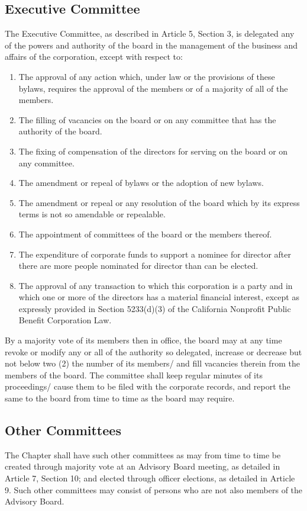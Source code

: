 \documentclass{article}
\begin{document}
	\subsection{Executive Committee}
	The Executive Committee, as described in Article 5, Section 3, is delegated any of the powers and authority of the board in the management of the business and affairs of the corporation, except with respect to:
	\begin{enumerate}[\indent (a)]
		\item The approval of any action which, under law or the provisions of these bylaws, requires the approval of the members or of a majority of all of the members.
		\item The filling of vacancies on the board or on any committee that has the authority of the board. 
		\item The fixing of compensation of the directors for serving on the board or on any committee.
		\item The amendment or repeal of bylaws or the adoption of new bylaws.
		\item The amendment or repeal or any resolution of the board which by its express terms is not so amendable or repealable.
		\item The appointment of committees of the board or the members thereof.
		\item The expenditure of corporate funds to support a nominee for director after there are more people nominated for director than can be elected.
		\item The approval of any transaction to which this corporation is a party and in which one or more of the directors has a material financial interest, except as expressly provided in Section 5233(d)(3) of the California Nonprofit Public Benefit Corporation Law.
	\end{enumerate}
	By a majority vote of its members then in office, the board may at any time revoke or modify any or all of the authority so delegated, increase or decrease but not below two (2) the number of its members/ and fill vacancies therein from the members of the board.
	The committee shall keep regular minutes of its proceedings/ cause them to be filed with the corporate records, and report the same to the board from time to time as the board may require.
	
	\subsection{Other Committees}
	The Chapter shall have such other committees as may from time to time be created through majority vote at an Advisory Board meeting, as detailed in Article 7, Section 10; and elected through officer elections, as detailed in Article 9. Such other committees may consist of persons who are not also members of the Advisory Board. %
	
\end{document}
